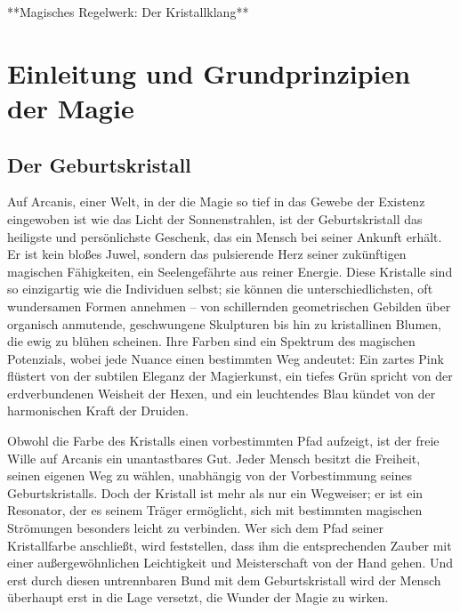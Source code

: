 \documentclass[10pt,a4paper,twocolumn,openany]{book}
\begin{document}
\tableofcontents

\mainmatter
\cleardoublepage











**Magisches Regelwerk: Der Kristallklang**

\chapter{Einleitung und Grundprinzipien der Magie}

\section{Der Geburtskristall}

Auf Arcanis, einer Welt, in der die Magie so tief in das Gewebe der Existenz eingewoben ist wie das Licht der Sonnenstrahlen, ist der Geburtskristall das heiligste und persönlichste Geschenk, das ein Mensch bei seiner Ankunft erhält. Er ist kein bloßes Juwel, sondern das pulsierende Herz seiner zukünftigen magischen Fähigkeiten, ein Seelengefährte aus reiner Energie. Diese Kristalle sind so einzigartig wie die Individuen selbst; sie können die unterschiedlichsten, oft wundersamen Formen annehmen – von schillernden geometrischen Gebilden über organisch anmutende, geschwungene Skulpturen bis hin zu kristallinen Blumen, die ewig zu blühen scheinen. Ihre Farben sind ein Spektrum des magischen Potenzials, wobei jede Nuance einen bestimmten Weg andeutet: Ein zartes Pink flüstert von der subtilen Eleganz der Magierkunst, ein tiefes Grün spricht von der erdverbundenen Weisheit der Hexen, und ein leuchtendes Blau kündet von der harmonischen Kraft der Druiden.

Obwohl die Farbe des Kristalls einen vorbestimmten Pfad aufzeigt, ist der freie Wille auf Arcanis ein unantastbares Gut. Jeder Mensch besitzt die Freiheit, seinen eigenen Weg zu wählen, unabhängig von der Vorbestimmung seines Geburtskristalls. Doch der Kristall ist mehr als nur ein Wegweiser; er ist ein Resonator, der es seinem Träger ermöglicht, sich mit bestimmten magischen Strömungen besonders leicht zu verbinden. Wer sich dem Pfad seiner Kristallfarbe anschließt, wird feststellen, dass ihm die entsprechenden Zauber mit einer außergewöhnlichen Leichtigkeit und Meisterschaft von der Hand gehen. Und erst durch diesen untrennbaren Bund mit dem Geburtskristall wird der Mensch überhaupt erst in die Lage versetzt, die Wunder der Magie zu wirken.
\end{document}
